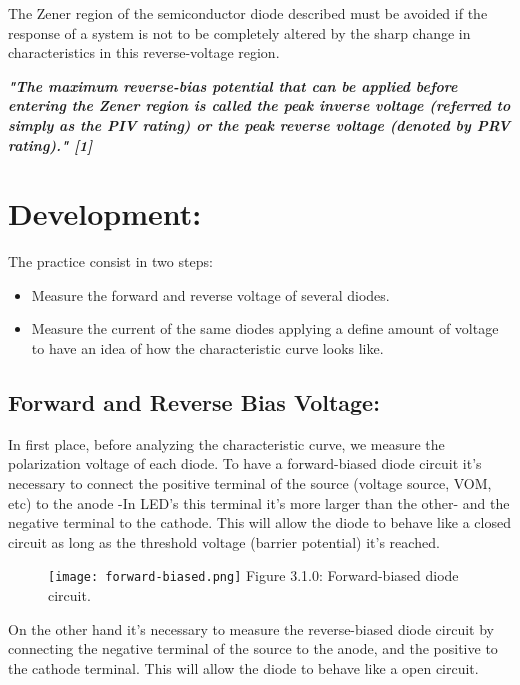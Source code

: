 \documentclass[10pt,a4paper]{article}
\begin{document}
The Zener region of the semiconductor diode described must be avoided if the response of a system is not to be completely altered by the sharp change in characteristics in this reverse-voltage region. \hfill \break \break

\textbf{\textit{\Large {"The maximum reverse-bias potential that can be applied before entering the Zener region is called the peak inverse voltage (referred to simply as the PIV rating) or the peak reverse voltage (denoted by PRV rating)." [1] }}}

\pagebreak

\section{Development:}

The practice consist in two steps:

\begin{itemize}
\item Measure the forward and reverse voltage of several diodes.
\item Measure the current of the same diodes applying a define amount of voltage to have an idea of how the characteristic curve looks like.
\end{itemize}

\subsection{Forward and Reverse Bias Voltage:}

In first place, before analyzing the characteristic curve, we measure the polarization voltage of each diode. To have a forward-biased  diode circuit it's necessary to connect the positive terminal of the source (voltage source, VOM, etc) to the anode -In LED's this terminal it's more larger than the other- and the negative terminal to the cathode. This will allow the diode to behave like a closed circuit as long as the threshold voltage (barrier potential) it's reached.

\begin{figure}[H]
\texttt{[image: forward-biased.png]}
\centering \linebreak Figure 3.1.0: Forward-biased diode circuit.
\end{figure}

On the other hand it's necessary to measure the reverse-biased diode circuit by connecting the negative terminal of the source to the anode, and the positive to the cathode terminal. This will allow the diode to behave like a open circuit.
\end{document}
